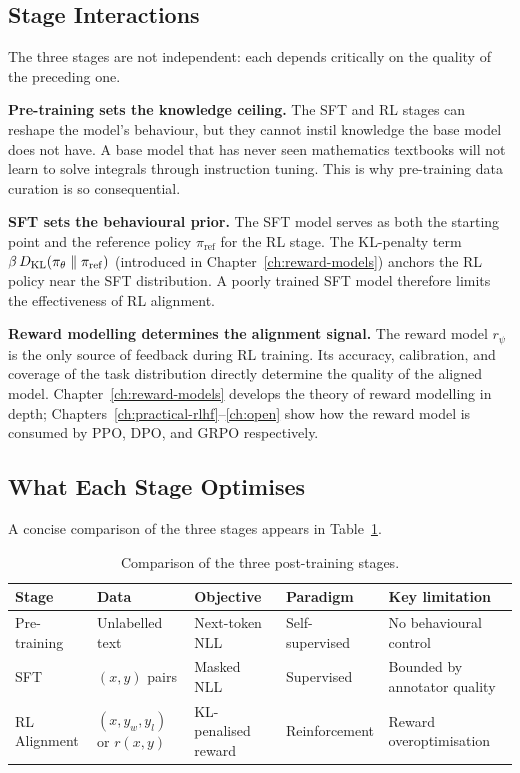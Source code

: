 \subsection{Stage Interactions}

The three stages are not independent: each depends critically on the quality of the preceding one.

\textbf{Pre-training sets the knowledge ceiling.} The SFT and RL stages can reshape the model's behaviour, but they cannot instil knowledge the base model does not have. A base model that has never seen mathematics textbooks will not learn to solve integrals through instruction tuning. This is why pre-training data curation is so consequential.

\textbf{SFT sets the behavioural prior.} The SFT model serves as both the starting point and the reference policy $\pi_{\mathrm{ref}}$ for the RL stage. The KL-penalty term $\beta\,D_{\mathrm{KL}}\!\left(\pi_\theta\;\|\;\pi_{\mathrm{ref}}\right)$ (introduced in Chapter~\ref{ch:reward-models}) anchors the RL policy near the SFT distribution. A poorly trained SFT model therefore limits the effectiveness of RL alignment.

\textbf{Reward modelling determines the alignment signal.} The reward model $r_\psi$ is the only source of feedback during RL training. Its accuracy, calibration, and coverage of the task distribution directly determine the quality of the aligned model. Chapter~\ref{ch:reward-models} develops the theory of reward modelling in depth; Chapters~\ref{ch:practical-rlhf}--\ref{ch:open} show how the reward model is consumed by PPO, DPO, and GRPO respectively.

\subsection{What Each Stage Optimises}

A concise comparison of the three stages appears in Table~\ref{tab:pipeline-comparison}.

\begin{table}[ht]
\centering
\caption{Comparison of the three post-training stages.}
\label{tab:pipeline-comparison}
\begin{tabular}{lllll}
\toprule
\textbf{Stage} & \textbf{Data} & \textbf{Objective} & \textbf{Paradigm} & \textbf{Key limitation} \\
\midrule
Pre-training   & Unlabelled text & Next-token NLL & Self-supervised & No behavioural control \\
SFT            & $(x, y)$ pairs  & Masked NLL & Supervised & Bounded by annotator quality \\
RL Alignment   & $(x, y_w, y_l)$ or $r(x,y)$ & KL-penalised reward & Reinforcement & Reward overoptimisation \\
\bottomrule
\end{tabular}
\end{table}

